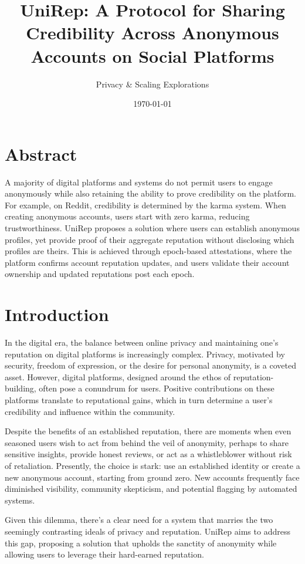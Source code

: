 \documentclass[11pt]{article}
\author{Privacy \& Scaling Explorations}
\date{\today}
\title{UniRep: A Protocol for Sharing Credibility Across Anonymous Accounts on Social Platforms}
\begin{document}
\maketitle
\tableofcontents

\section{Abstract}
\label{sec:org5f8ca5f}

A majority of digital platforms and systems do not permit users to engage anonymously while also retaining the ability to prove credibility on the platform. For example, on Reddit, credibility is determined by the karma system. When creating anonymous accounts, users start with zero karma, reducing trustworthiness. UniRep proposes a solution where users can establish anonymous profiles, yet provide proof of their aggregate reputation without disclosing which profiles are theirs. This is achieved through epoch-based attestations, where the platform confirms account reputation updates, and users validate their account ownership and updated reputations post each epoch.
\section{Introduction}
\label{sec:orgb3cde13}

In the digital era, the balance between online privacy and maintaining one's reputation on digital platforms is increasingly complex. Privacy, motivated by security, freedom of expression, or the desire for personal anonymity, is a coveted asset. However, digital platforms, designed around the ethos of reputation-building, often pose a conundrum for users. Positive contributions on these platforms translate to reputational gains, which in turn determine a user's credibility and influence within the community.

Despite the benefits of an established reputation, there are moments when even seasoned users wish to act from behind the veil of anonymity, perhaps to share sensitive insights, provide honest reviews, or act as a whistleblower without risk of retaliation. Presently, the choice is stark: use an established identity or create a new anonymous account, starting from ground zero. New accounts frequently face diminished visibility, community skepticism, and potential flagging by automated systems.

Given this dilemma, there's a clear need for a system that marries the two seemingly contrasting ideals of privacy and reputation. UniRep aims to address this gap, proposing a solution that upholds the sanctity of anonymity while allowing users to leverage their hard-earned reputation.
\end{document}
